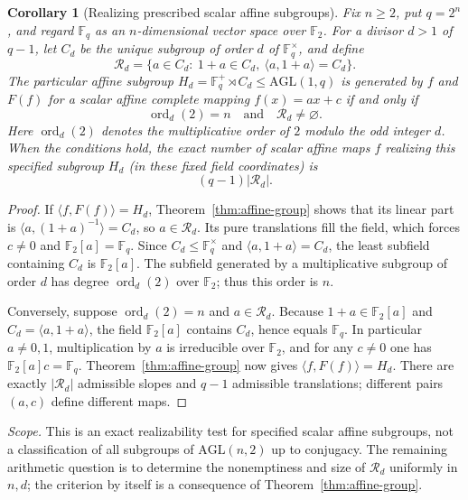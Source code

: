 \documentclass[11pt]{article}
\newtheorem{corollary}[theorem]{Corollary}
\begin{document}
\begin{corollary}[Realizing prescribed scalar affine subgroups]\label{cor:scalar-realization}
Fix $n\ge2$, put $q=2^n$, and regard $\mathbb F_q$ as an
$n$-dimensional vector space over $\mathbb F_2$. For a divisor
$d>1$ of $q-1$, let $C_d$ be the unique subgroup of order $d$
of $\mathbb F_q^\times$, and define
\[
\mathcal R_d=\{a\in C_d:\ 1+a\in C_d,\
                  \langle a,1+a\rangle=C_d\}.
\]
The particular affine subgroup
$H_d=\mathbb F_q^+\rtimes C_d\le\mathrm{AGL}(1,q)$
is generated by $f$ and $F(f)$ for a scalar affine complete mapping
$f(x)=ax+c$ if and only if
\[
\operatorname{ord}_d(2)=n\quad\text{and}\quad\mathcal R_d\ne\varnothing.
\]
Here $\operatorname{ord}_d(2)$ denotes the multiplicative order of $2$
modulo the odd integer $d$. When the conditions hold, the exact number
of scalar affine maps $f$ realizing this specified subgroup $H_d$
(in these fixed field coordinates) is
\[
(q-1)|\mathcal R_d|.
\]
\end{corollary}
\begin{proof}
If $\langle f,F(f)\rangle=H_d$, Theorem~\ref{thm:affine-group}
shows that its linear part is $\langle a,(1+a)^{-1}\rangle=C_d$,
so $a\in\mathcal R_d$. Its pure translations fill the field,
which forces $c\ne0$ and $\mathbb F_2[a]=\mathbb F_q$.
Since $C_d\le\mathbb F_q^\times$ and $\langle a,1+a\rangle=C_d$,
the least subfield containing $C_d$ is $\mathbb F_2[a]$.
The subfield generated by a multiplicative subgroup of order $d$
has degree $\operatorname{ord}_d(2)$ over $\mathbb F_2$;
thus this order is $n$.

Conversely, suppose $\operatorname{ord}_d(2)=n$ and
$a\in\mathcal R_d$. Because $1+a\in\mathbb F_2[a]$ and
$C_d=\langle a,1+a\rangle$, the field $\mathbb F_2[a]$
contains $C_d$, hence equals $\mathbb F_q$. In particular
$a\ne0,1$, multiplication by $a$ is irreducible over
$\mathbb F_2$, and for any $c\ne0$ one has
$\mathbb F_2[a]c=\mathbb F_q$. Theorem~\ref{thm:affine-group}
now gives $\langle f,F(f)\rangle=H_d$. There are exactly
$|\mathcal R_d|$ admissible slopes and $q-1$ admissible
translations; different pairs $(a,c)$ define different maps.
\end{proof}

\noindent\emph{Scope.} This is an exact realizability test for
specified scalar affine subgroups, not a classification of all
subgroups of $\mathrm{AGL}(n,2)$ up to conjugacy. The remaining
arithmetic question is to determine the nonemptiness and size of
$\mathcal R_d$ uniformly in $n,d$; the criterion by itself is a
consequence of Theorem~\ref{thm:affine-group}.
\end{document}
